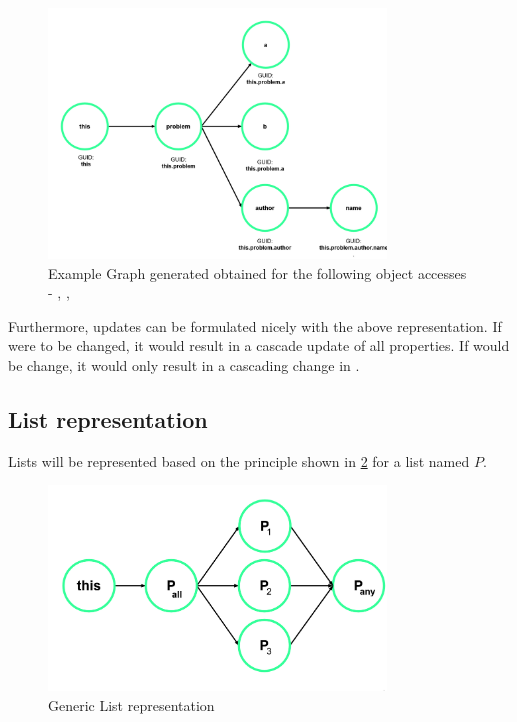 \begin{figure}[H]
    \includegraphics[width=0.8\textwidth]{images/graph_object.png}
     \caption{Example Graph generated obtained for the following object accesses - , ,   }
     \label{fig:graph_object}
\end{figure}

Furthermore, updates can be formulated nicely with the above representation. If  were to be changed, it would result in a cascade update of all properties. If  would be change, it would only result in a cascading change in . \subsection{List representation}

Lists will be represented based on the principle shown in \ref{fig:graph_list_generic} for a list named $P$.  
\begin{figure}[H]
    \includegraphics[width=0.8\textwidth]{images/graph_list_generic.png}
     \caption{Generic List representation}
     \label{fig:graph_list_generic}
\end{figure}

